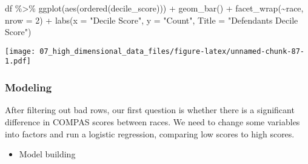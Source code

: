 \documentclass[
]{book}
\newenvironment{Shaded}{\begin{snugshade}}{\end{snugshade}}
\newcommand{\AttributeTok}[1]{\textcolor[rgb]{0.77,0.63,0.00}{#1}}
\newcommand{\DecValTok}[1]{\textcolor[rgb]{0.00,0.00,0.81}{#1}}
\newcommand{\FunctionTok}[1]{\textcolor[rgb]{0.00,0.00,0.00}{#1}}
\newcommand{\NormalTok}[1]{#1}
\newcommand{\SpecialCharTok}[1]{\textcolor[rgb]{0.00,0.00,0.00}{#1}}
\newcommand{\StringTok}[1]{\textcolor[rgb]{0.31,0.60,0.02}{#1}}
\providecommand{\tightlist}{%
  \setlength{\itemsep}{0pt}\setlength{\parskip}{0pt}}
\begin{document}
\begin{Shaded}
\begin{Highlighting}[]
\NormalTok{df }\SpecialCharTok{\%\textgreater{}\%}
  \FunctionTok{ggplot}\NormalTok{(}\FunctionTok{aes}\NormalTok{(}\FunctionTok{ordered}\NormalTok{(decile\_score))) }\SpecialCharTok{+} 
          \FunctionTok{geom\_bar}\NormalTok{() }\SpecialCharTok{+}
          \FunctionTok{facet\_wrap}\NormalTok{(}\SpecialCharTok{\textasciitilde{}}\NormalTok{race, }\AttributeTok{nrow =} \DecValTok{2}\NormalTok{) }\SpecialCharTok{+}
          \FunctionTok{labs}\NormalTok{(}\AttributeTok{x =} \StringTok{"Decile Score"}\NormalTok{,}
               \AttributeTok{y =} \StringTok{"Count"}\NormalTok{,}
               \AttributeTok{Title =} \StringTok{"Defendant\textquotesingle{}s Decile Score"}\NormalTok{)}
\end{Highlighting}
\end{Shaded}

\texttt{[image: 07\_high\_dimensional\_data\_files/figure-latex/unnamed-chunk-87-1.pdf]}

\hypertarget{modeling}{%
\subsubsection{Modeling}\label{modeling}}

After filtering out bad rows, our first question is whether there is a significant difference in COMPAS scores between races. We need to change some variables into factors and run a logistic regression, comparing low scores to high scores.

\begin{itemize}
\tightlist
\item
  Model building
\end{itemize}
\end{document}
